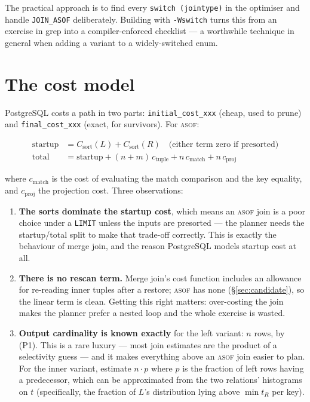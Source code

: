 \documentclass[11pt,a4paper]{report}
\theoremstyle{definition}
\theoremstyle{plain}
\newcommand{\code}[1]{\texttt{\small #1}}
\newcommand{\asof}{{\normalfont\scshape asof}}
\begin{document}
The practical approach is to find every \code{switch (jointype)} in the optimiser and
handle \code{JOIN\_ASOF} deliberately. Building with \code{-Wswitch} turns this from an
exercise in grep into a compiler-enforced checklist --- a worthwhile technique in general
when adding a variant to a widely-switched enum.

\section{The cost model}

PostgreSQL costs a path in two parts: \code{initial\_cost\_xxx} (cheap, used to prune) and
\code{final\_cost\_xxx} (exact, for survivors). For \asof{}:

\begin{align}
\text{startup} &= C_{\text{sort}}(L) + C_{\text{sort}}(R) \quad\text{(either term zero if presorted)}\\
\text{total}   &= \text{startup} + (n + m)\,c_{\text{tuple}} + n\,c_{\text{match}} + n\,c_{\text{proj}}
\end{align}

where $c_{\text{match}}$ is the cost of evaluating the match comparison and the key
equality, and $c_{\text{proj}}$ the projection cost. Three observations:

\begin{enumerate}[leftmargin=*]
\item \textbf{The sorts dominate the startup cost}, which means an \asof{} join is a poor
      choice under a \code{LIMIT} unless the inputs are presorted --- the planner needs the
      startup/total split to make that trade-off correctly. This is exactly the behaviour of
      merge join, and the reason PostgreSQL models startup cost at all.
\item \textbf{There is no rescan term.} Merge join's cost function includes an allowance for
      re-reading inner tuples after a restore; \asof{} has none
      (\S\ref{sec:candidate}), so the linear term is clean. Getting this right matters:
      over-costing the join makes the planner prefer a nested loop and the whole exercise is
      wasted.
\item \textbf{Output cardinality is known exactly} for the left variant: $n$ rows,
      by (P1). This is a rare luxury --- most join estimates are the product of a selectivity
      guess --- and it makes everything above an \asof{} join easier to plan. For the inner
      variant, estimate $n \cdot p$ where $p$ is the fraction of left rows having a
      predecessor, which can be approximated from the two relations' histograms on $t$
      (specifically, the fraction of $L$'s distribution lying above $\min t_R$ per key).
\end{enumerate}
\end{document}
